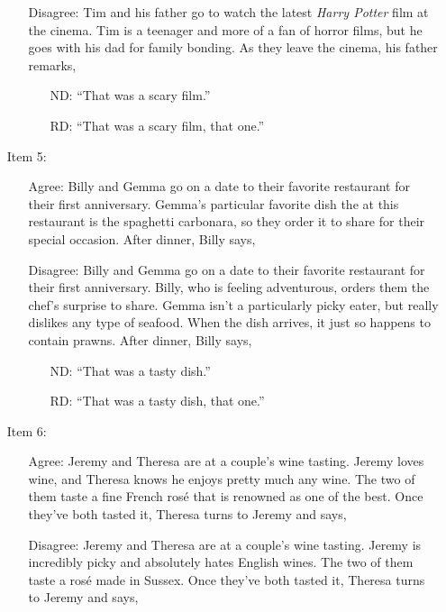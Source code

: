 \documentclass[titlepage,12pt]{article}
\begin{document}
\begin{appendices}
\begin{enumerate}
\begin{enumerate}
        \item [Disagree:] Tim and his father go to watch the latest \textit{Harry Potter} film at the cinema. Tim is a teenager and more of a fan of horror films, but he goes with his dad for family bonding. As they leave the cinema, his father remarks,
        \begin{itemize}
        \setlength{\itemindent}{5em}
            \item [ND:] ``That was a scary film.''
            \item [RD:] ``That was a scary film, that one.''
        \end{itemize}
    \end{enumerate}
    \item [Item 5:] \hfill \begin{enumerate}
        \item [Agree:] Billy and Gemma go on a date to their favorite restaurant for their first anniversary. Gemma's particular favorite dish the at this restaurant is the spaghetti carbonara, so they order it to share for their special occasion. After dinner, Billy says,
        \item [Disagree:] Billy and Gemma go on a date to their favorite restaurant for their first anniversary. Billy, who is feeling adventurous, orders them the chef's surprise to share. Gemma isn't a particularly picky eater, but really dislikes any type of seafood. When the dish arrives, it just so happens to contain prawns. After dinner, Billy says,
        \begin{itemize}
        \setlength{\itemindent}{5em}
            \item [ND:] ``That was a tasty dish.''
            \item [RD:] ``That was a tasty dish, that one.''
        \end{itemize}
    \end{enumerate}
    \item [Item 6:]\hfill  \begin{enumerate}
        \item [Agree:] Jeremy and Theresa are at a couple's wine tasting. Jeremy loves wine, and Theresa knows he enjoys pretty much any wine. The two of them taste a fine French rosé that is renowned as one of the best. Once they've both tasted it, Theresa turns to Jeremy and says,
        \item [Disagree:] Jeremy and Theresa are at a couple's wine tasting. Jeremy is incredibly picky and absolutely hates English wines. The two of them taste a rosé made in Sussex. Once they've both tasted it, Theresa turns to Jeremy and says,

\end{enumerate}
\end{enumerate}
\end{appendices}
\end{document}
